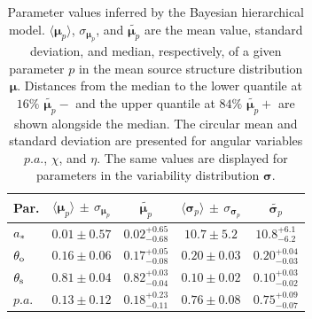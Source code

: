 \documentclass[linenumbers, twocolumn, tighten]{aastex701}
\begin{document}


\begin{table}[ht!]
\centering
\caption{Parameter values inferred by the Bayesian hierarchical model. $\langle\boldsymbol{\mu}_p\rangle$, $\sigma_{\boldsymbol{\mu}_p}$, and  $\widetilde{\boldsymbol{\mu}_p}$ are the mean value, standard deviation, and median, respectively, of a given parameter $p$ in the mean source structure distribution $\boldsymbol{\mu}$. Distances from the median to the lower quantile at $16\%$ $\widetilde{\boldsymbol{\mu}_p}-$ and the upper quantile at $84\%$ $\widetilde{\boldsymbol{\mu}_p}+$ are shown alongside the median. The circular mean and standard deviation are presented for angular variables $p.a.$, $\chi$, and $\eta$. The same values are displayed for parameters in the variability distribution $\boldsymbol{\sigma}$.}
\label{tab:stacking-no-restrict}
\begin{tabular}{l|cccc}
\hline\hline
\textbf{Par.} & \textbf{$\langle\boldsymbol{\mu}_p\rangle$} $\pm$ \textbf{$\sigma_{\boldsymbol{\mu}_p}$} & $\widetilde{\boldsymbol{\mu}_p}$ & \textbf{$\langle\boldsymbol{\sigma}_p\rangle$} $\pm$ \textbf{$\sigma_{\boldsymbol{\sigma}_p}$} & $\widetilde{\boldsymbol{\sigma}_p}$ \\
\hline
$a_{\rm *}$ & $0.01\pm 0.57$ & $0.02^{+0.65}_{-0.68}$
 & $10.7\pm5.2$ & $10.8^{+6.1}_{-6.2}$
 \\
$\theta_{\rm o}$ & $0.16\pm0.06$ & $0.17^{+0.05}_{-0.08}$
 & $0.20 \pm 0.03$ & $0.20^{+0.04}_{-0.03}$
 \\
$\theta_{\rm s}$ & $0.81\pm0.04$ & $0.82^{+0.03}_{-0.04}$
 & $0.10 \pm 0.02$ & $0.10^{+0.03}_{-0.02}$
 \\
$p.a.$ & $0.13\pm0.12$ & $0.18^{+0.23}_{-0.11}$ & $0.76 \pm 0.08$ & $0.75^{+0.09}_{-0.07}$

\end{tabular}
\end{table}
\end{document}

